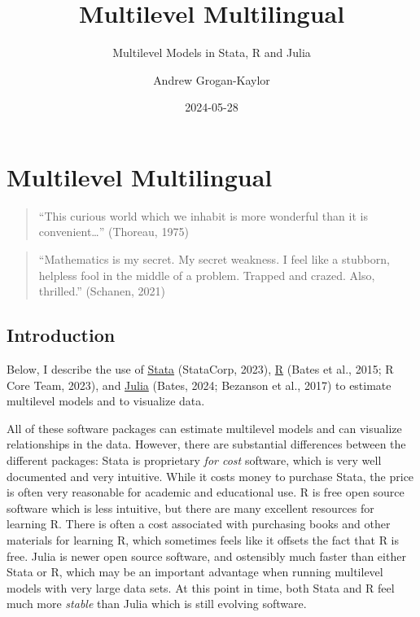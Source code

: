 \documentclass[
  letterpaper,
  DIV=11,
  numbers=noendperiod]{scrreprt}
\title{Multilevel Multilingual}
\subtitle{Multilevel Models in Stata, R and Julia}
\author{Andrew Grogan-Kaylor}
\date{2024-05-28}
\renewcommand*\contentsname{Table of contents}
\newcommand\contentsname{Table of contents}
\begin{document}
\maketitle

\renewcommand*\contentsname{Table of contents}
{
\hypersetup{linkcolor=}
\setcounter{tocdepth}{2}
\tableofcontents
}
\listoftables
{}

\chapter{Multilevel Multilingual}\label{multilevel-multilingual}

\begin{quote}
``This curious world which we inhabit is more wonderful than it is
convenient\ldots{}'' (Thoreau, 1975)
\end{quote}

\begin{quote}
``Mathematics is my secret. My secret weakness. I feel like a stubborn,
helpless fool in the middle of a problem. Trapped and crazed. Also,
thrilled.'' (Schanen, 2021)
\end{quote}

\section{Introduction}\label{introduction}

Below, I describe the use of \href{https://www.stata.com/}{Stata}
(StataCorp, 2023), \href{https://www.r-project.org/}{R} (Bates et al.,
2015; R Core Team, 2023), and \href{https://www.julialang.org/}{Julia}
(Bates, 2024; Bezanson et al., 2017) to estimate multilevel models and
to visualize data.

All of these software packages can estimate multilevel models and can
visualize relationships in the data. However, there are substantial
differences between the different packages: Stata is proprietary
\emph{for cost} software, which is very well documented and very
intuitive. While it costs money to purchase Stata, the price is often
very reasonable for academic and educational use. R is free open source
software which is less intuitive, but there are many excellent resources
for learning R. There is often a cost associated with purchasing books
and other materials for learning R, which sometimes feels like it
offsets the fact that R is free. Julia is newer open source software,
and ostensibly much faster than either Stata or R, which may be an
important advantage when running multilevel models with very large data
sets. At this point in time, both Stata and R feel much more
\emph{stable} than Julia which is still evolving software.
\end{document}
